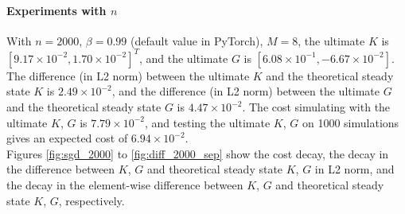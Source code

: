 \documentclass{article}
\begin{document}
\paragraph{Experiments with $n$}
With $n = 2000$, $\beta = 0.99$ (default value in PyTorch), $M = 8$, the ultimate $K$ is $[9.17\times 10^{-2}, 1.70\times 10^{-2}]^T$, and the ultimate $G$ is $[6.08\times 10^{-1}, -6.67\times 10^{-2}]$. The difference (in L2 norm) between the ultimate $K$ and the theoretical steady state $K$ is $2.49\times 10^{-2}$, and the difference (in L2 norm) between the ultimate $G$ and the theoretical steady state $G$ is $4.47\times 10^{-2}$. The cost simulating with the ultimate $K$, $G$ is $7.79\times 10^{-2}$, and testing the ultimate $K$, $G$ on 1000 simulations gives an expected cost of $6.94\times 10^{-2}$.\\
Figures \ref{fig:sgd_2000} to \ref{fig:diff_2000_sep} show the cost decay, the decay in the difference between $K$, $G$ and theoretical steady state $K$, $G$ in L2 norm, and the decay in the element-wise difference between $K$, $G$ and theoretical steady state $K$, $G$, respectively. \\
\end{document}
